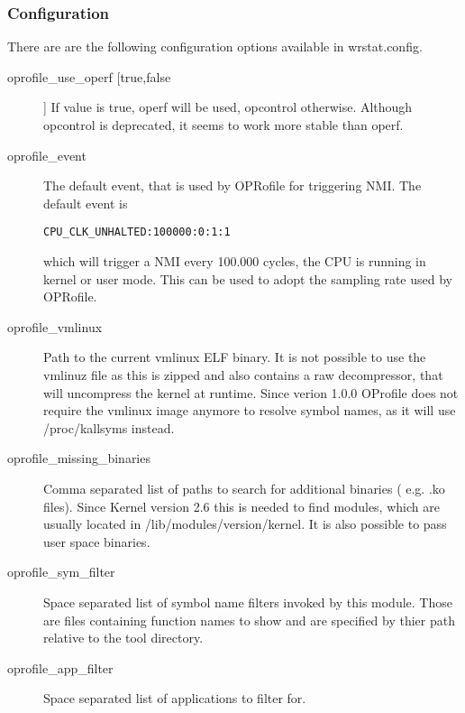     \subsubsection{Configuration}
    There are are the following configuration options available in wrstat.config.
    \begin{description}
        \item[oprofile\_use\_operf [true,false]]
            If value is true, operf will be used, opcontrol otherwise.
            Although opcontrol is deprecated, it seems to work more stable than operf.
        \item[oprofile\_event]
            The default event, that is used by OPRofile for triggering NMI.
            The default event is 
            \begin{lstlisting}
CPU_CLK_UNHALTED:100000:0:1:1
            \end{lstlisting}
            which will trigger a NMI every 100.000 cycles, the CPU is running
            in kernel or user mode.
            This can be used to adopt the sampling rate used by OPRofile.
        \item[oprofile\_vmlinux]
            Path to the current vmlinux ELF binary.
            It is not possible to use the vmlinuz file as this is zipped and also
            contains a raw decompressor, that will uncompress the kernel at runtime.
            Since verion 1.0.0 OProfile does not require the vmlinux image anymore 
            to resolve symbol names, as it will use /proc/kallsyms instead.
        \item[oprofile\_missing\_binaries]
            Comma separated list of paths to search for additional binaries ( e.g. .ko files).
            Since Kernel version 2.6 this is needed to find modules, which
            are usually located in /lib/modules/version/kernel.
            It is also possible to pass user space binaries.
        \item[oprofile\_sym\_filter]
            Space separated list of symbol name filters invoked by this module.
            Those are files containing function names to show
            and are specified by thier path relative to the tool directory.
        \item[oprofile\_app\_filter]
            Space separated list of applications to filter for.
    \end{description}


